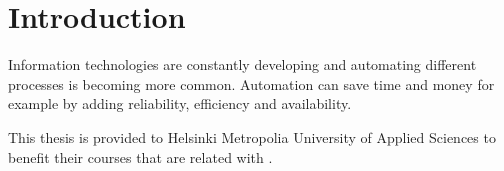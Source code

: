
\chapter{Introduction}

Information technologies are constantly developing and automating different processes is becoming more common. Automation can save time and money for example by adding reliability, efficiency and availability.

This thesis is provided to Helsinki Metropolia University of Applied Sciences to benefit their courses that are related with .



\clearpage %
